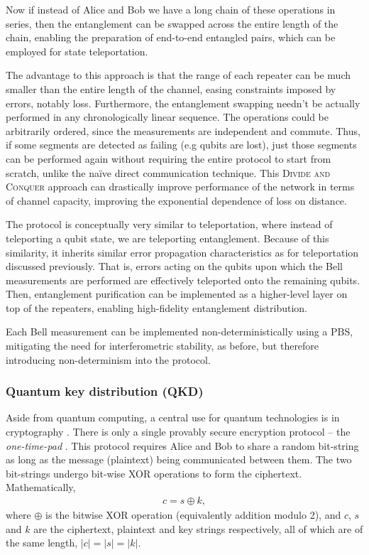 \documentclass[aps,rmp,twocolumn,amsmath,amssymb,nofootinbib,superscriptaddress,longbibliography,floatfix,table-of-contents,eqsecnum]{revtex4-1}
\begin{document}
Now if instead of Alice and Bob we have a long chain of these operations in series, then the entanglement can be swapped across the entire length of the chain, enabling the preparation of end-to-end entangled pairs, which can be employed for state teleportation.

The advantage to this approach is that the range of each repeater can be much smaller than the entire length of the channel, easing constraints imposed by errors, notably loss. Furthermore, the entanglement swapping needn't be actually performed in any chronologically linear sequence. The operations could be arbitrarily ordered, since the measurements are independent and commute. Thus, if some segments are detected as failing (e.g qubits are lost), just those segments can be performed again without requiring the entire protocol to start from scratch, unlike the na{\" i}ve direct communication technique. This \textsc{Divide and Conquer} approach can drastically improve performance of the network in terms of channel capacity, improving the exponential dependence of loss on distance. 

The protocol is conceptually very similar to teleportation, where instead of teleporting a qubit state, we are teleporting entanglement. Because of this similarity, it inherits similar error propagation characteristics as for teleportation discussed previously. That is, errors acting on the qubits upon which the Bell measurements are performed are effectively teleported onto the remaining qubits. Then, entanglement purification can be implemented as a higher-level layer on top of the repeaters, enabling high-fidelity entanglement distribution.

Each Bell measurement can be implemented non-deterministically using a PBS, mitigating the need for interferometric stability, as before, but therefore introducing non-determinism into the protocol.

%
%

\subsubsection{Quantum key distribution (QKD)} \label{sec:QKD} 

Aside from quantum computing, a central use for quantum technologies is in cryptography \cite{bib:Gisin02}. There is only a single provably secure encryption protocol -- the \textit{one-time-pad} \cite{bib:Schneier96}. This protocol requires Alice and Bob to share a random bit-string as long as the message (plaintext) being communicated between them. The two bit-strings undergo bit-wise XOR operations to form the ciphertext. Mathematically,
\begin{align}
c = s \oplus k,
\end{align}
where $\oplus$ is the bitwise XOR operation (equivalently addition modulo 2), and $c$, $s$ and $k$ are the ciphertext, plaintext and key strings respectively, all of which are of the same length, \mbox{$|c|=|s|=|k|$}.
\end{document}
